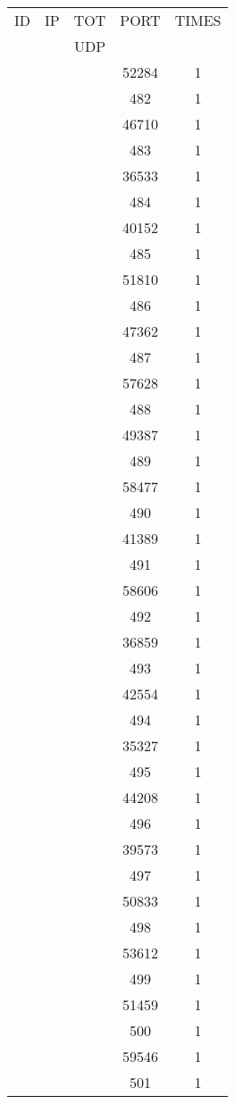 \documentclass[a4paper]{scrartcl}
\begin{document}
\begin{minipage}[b]{0.5\linewidth}
\begin{tabular}{| c | c | c | c | c |}
\hline
ID & IP & TOT & PORT & TIMES \\ 
   &    & UDP &      &       \\ 
\hline
& & & 52284 & 1 \\ & & & 482 & 1 \\ & & & 46710 & 1 \\ & & & 483 & 1 \\ & & & 36533 & 1 \\ & & & 484 & 1 \\ & & & 40152 & 1 \\ & & & 485 & 1 \\ & & & 51810 & 1 \\ & & & 486 & 1 \\ & & & 47362 & 1 \\ & & & 487 & 1 \\ & & & 57628 & 1 \\ & & & 488 & 1 \\ & & & 49387 & 1 \\ & & & 489 & 1 \\ & & & 58477 & 1 \\ & & & 490 & 1 \\ & & & 41389 & 1 \\ & & & 491 & 1 \\ & & & 58606 & 1 \\ & & & 492 & 1 \\ & & & 36859 & 1 \\ & & & 493 & 1 \\ & & & 42554 & 1 \\ & & & 494 & 1 \\ & & & 35327 & 1 \\ & & & 495 & 1 \\ & & & 44208 & 1 \\ & & & 496 & 1 \\ & & & 39573 & 1 \\ & & & 497 & 1 \\ & & & 50833 & 1 \\ & & & 498 & 1 \\ & & & 53612 & 1 \\ & & & 499 & 1 \\ & & & 51459 & 1 \\ & & & 500 & 1 \\ & & & 59546 & 1 \\ & & & 501 & 1 \\ \hline\end{tabular}\end{minipage} \hfill\begin{minipage}[b]{0.5\linewidth}\begin{tabular}{| c | c | c | c | c |}

\end{tabular}
\end{minipage}
\end{document}

